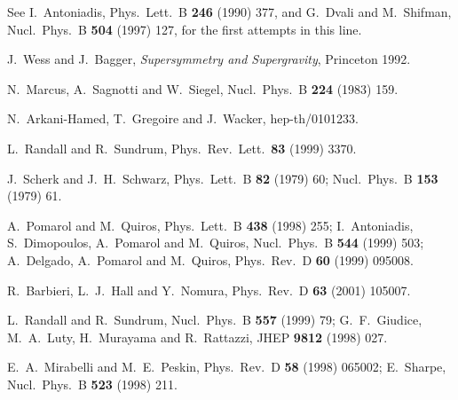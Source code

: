 \documentclass[a4paper,12pt]{article}
\begin{document}
\newpage

\begin{thebibliography}{99}


See I.~Antoniadis,
Phys.\ Lett.\ B {\bf 246} (1990) 377, and
G.~Dvali and M.~Shifman,
Nucl.\ Phys.\ B {\bf 504} (1997) 127,
for the first attempts in this line.


J.~Wess and J.~Bagger, 
{\it Supersymmetry and Supergravity}, Princeton 1992.




N.~Marcus, A.~Sagnotti and W.~Siegel,
Nucl.\ Phys.\ B {\bf 224} (1983) 159.


N.~Arkani-Hamed, T.~Gregoire and J.~Wacker,
hep-th/0101233.




L.~Randall and R.~Sundrum,
Phys.\ Rev.\ Lett.\  {\bf 83} (1999) 3370.



  J.~Scherk and J.~H.~Schwarz,
Phys.\ Lett.\ B {\bf 82} (1979) 60;
Nucl.\ Phys.\ B {\bf 153} (1979) 61.



A.~Pomarol and M.~Quiros,
Phys.\ Lett.\ B {\bf 438} (1998) 255;
I.~Antoniadis, S.~Dimopoulos, A.~Pomarol and M.~Quiros,
Nucl.\ Phys.\ B {\bf 544} (1999) 503;
A.~Delgado, A.~Pomarol and M.~Quiros,
Phys.\ Rev.\ D {\bf 60} (1999) 095008.



R.~Barbieri, L.~J.~Hall and Y.~Nomura,
Phys.\ Rev.\ D {\bf 63} (2001) 105007.







L.~Randall and R.~Sundrum,
Nucl.\ Phys.\ B {\bf 557} (1999) 79;
G.~F.~Giudice, M.~A.~Luty, H.~Murayama and R.~Rattazzi,
JHEP {\bf 9812} (1998) 027.



E.~A.~Mirabelli and M.~E.~Peskin,
Phys.\ Rev.\ D {\bf 58} (1998) 065002;
E.~Sharpe,
Nucl.\ Phys.\ B {\bf 523} (1998) 211.







\end{thebibliography}
\end{document}
